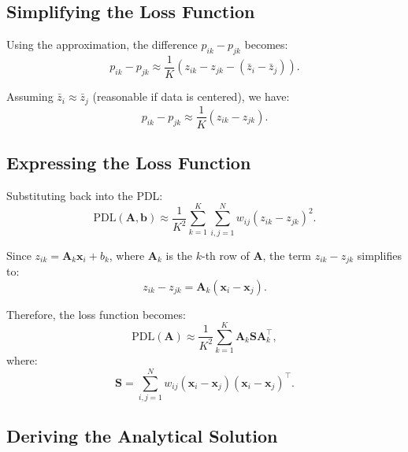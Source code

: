 \documentclass[journal]{IEEEtran}
\begin{document}
\subsection{Simplifying the Loss Function}

Using the approximation, the difference \( p_{ik} - p_{jk} \) becomes:
\begin{equation} \label{eq9}
p_{ik} - p_{jk} \approx \frac{1}{K} \left( z_{ik} - z_{jk} - (\bar{z}_i - \bar{z}_j) \right).
\end{equation}

Assuming \( \bar{z}_i \approx \bar{z}_j \) (reasonable if data is centered), we have:
\begin{equation} \label{eq10}
p_{ik} - p_{jk} \approx \frac{1}{K} \left( z_{ik} - z_{jk} \right).
\end{equation}

\subsection{Expressing the Loss Function}

Substituting back into the PDL:
\begin{equation} \label{eq11}
\text{PDL}(\mathbf{A}, \mathbf{b}) \approx \frac{1}{K^2} \sum_{k=1}^{K} \sum_{i,j=1}^{N} w_{ij} \left( z_{ik} - z_{jk} \right)^2.
\end{equation}

Since \( z_{ik} = \mathbf{A}_k \mathbf{x}_i + b_k \), where \( \mathbf{A}_k \) is the \( k \)-th row of \( \mathbf{A} \), the term \( z_{ik} - z_{jk} \) simplifies to:
\begin{equation} \label{eq12}
z_{ik} - z_{jk} = \mathbf{A}_k (\mathbf{x}_i - \mathbf{x}_j).
\end{equation}

Therefore, the loss function becomes:
\begin{equation} \label{eq13}
\text{PDL}(\mathbf{A}) \approx \frac{1}{K^2} \sum_{k=1}^{K} \mathbf{A}_k \mathbf{S} \mathbf{A}_k^\top,
\end{equation}
where:
\begin{equation} \label{eq14}
\mathbf{S} = \sum_{i,j=1}^{N} w_{ij} (\mathbf{x}_i - \mathbf{x}_j)(\mathbf{x}_i - \mathbf{x}_j)^\top.
\end{equation}

\subsection{Deriving the Analytical Solution}
\end{document}
